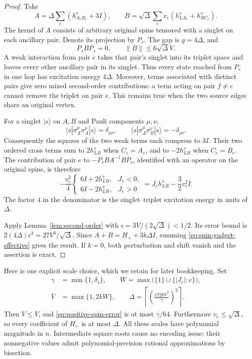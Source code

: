 \begin{proof}
Take
\[
 A=\Delta\sum_e(h^s_{A_eB_e}+3I),\qquad
 B=\sqrt\Delta\sum_e v_e(h^s_{LA_e}+h^s_{RC_e}).
\]
The kernel of $A$ consists of arbitrary original spins tensored with a
singlet on each ancillary pair.  Denote its projection by $P_s$.
The gap is $g=4\Delta$, and
\[
 P_sBP_s=0,\qquad
 \lVert B\rVert\leq6\sqrt\Delta V.
\]
A weak interaction from pair $e$ takes that pair's singlet into its
triplet space and leaves every other ancillary pair in its singlet.
Thus every state reached from $P_s$ in one hop has excitation energy
$4\Delta$.  Moreover, terms associated with distinct pairs give zero
mixed second-order contributions: a term acting on pair $f\neq e$
cannot remove the triplet on pair $e$.  This remains true when the two
source edges share an original vertex.

For a singlet $|s\rangle$ on $A,B$ and Pauli components $\mu,\nu$,
\[
 \langle s|\sigma_A^\mu\sigma_A^\nu|s\rangle
       =\delta_{\mu\nu},\qquad
 \langle s|\sigma_A^\mu\sigma_B^\nu|s\rangle
       =-\delta_{\mu\nu}.
\]
Consequently the squares of the two weak terms each compress to $3I$.
Their two ordered cross terms sum to $2h^s_{LR}$ when $C_e=A_e$,
and to $-2h^s_{LR}$ when $C_e=B_e$.  The contribution of pair $e$ to
$-P_sBA^{-1}BP_s$, identified with an operator on the original spins,
is therefore
\begin{equation}\label{eq:spin-gadget-effective}
 -\frac{v_e^2}{4}
 \begin{cases}
  6I+2h^s_{LR},&J_e<0,\\
  6I-2h^s_{LR},&J_e>0
 \end{cases}
 =J_e h^s_{LR}-\frac32v_e^2 I.
\end{equation}
The factor $4$ in the denominator is the singlet--triplet excitation
energy in units of $\Delta$.

Apply Lemma~\ref{lem:second-order} with
$\epsilon=3V/(2\sqrt\Delta)<1/2$.  Its error bound is
$2(4\Delta)\epsilon^3=27V^3/\sqrt\Delta$.
Since $A+B=H_++3k\Delta I$, summing
\eqref{eq:spin-gadget-effective} gives the result.  If $k=0$, both
perturbation and shift vanish and the assertion is exact.
\end{proof}

Here is one explicit scale choice, which we retain for later bookkeeping.
Set
\begin{equation}\label{eq:spin-scale}
 \begin{split}
 \gamma&=\min\{1,\delta_s\},\qquad
 W=\max\bigl(\{1\}\cup\{|J_e|:e\}\bigr),\\
 \overline V&=\max\{1,2kW\},\qquad
 \Delta=\left\lceil
       \left(\frac{1728\overline V^3}{\gamma}\right)^2
             \right\rceil.
 \end{split}
\end{equation}
Then $V\leq\overline V$, and
\eqref{eq:positive-spin-error} is at most $\gamma/64$.
Furthermore $v_e\leq\sqrt\Delta$, so every coefficient of $H_+$ is
at most $\Delta$.  All these scales have polynomial magnitude in $n$.
Intermediate square roots cause no encoding issue: their nonnegative
values admit polynomial-precision rational approximations by bisection.

